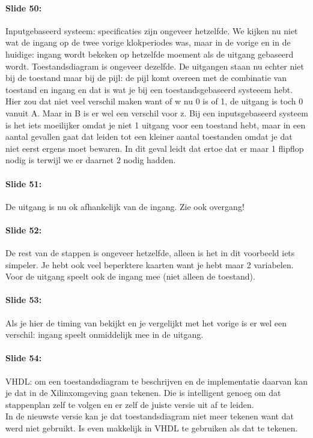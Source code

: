 \documentclass[10pt,a4paper]{book}
\begin{document}
\paragraph{Slide 50:} Inputgebaseerd systeem: specificaties zijn ongeveer hetzelfde. We kijken nu niet wat de ingang op de twee vorige klokperiodes was, maar in de vorige en in de huidige: ingang wordt bekeken op hetzelfde moement als de uitgang gebaseerd wordt. Toestandsdiagram is ongeveer dezelfde. De uitgangen staan nu echter niet bij de toestand maar bij de pijl: de pijl komt overeen met de combinatie van toestand en ingang en dat is wat je bij een toestandsgebaseerd systeeem hebt. Hier zou dat niet veel verschil maken want of w nu 0 is of 1, de uitgang is toch 0 vanuit A. Maar in B is er wel een verschil voor z.
Bij een inputsgebaseerd systeem is het iets moeilijker omdat je niet 1 uitgang voor een toestand hebt, maar in een aantal gevallen gaat dat leiden tot een kleiner aantal toestanden omdat je dat niet eerst ergens moet bewaren.  In dit geval leidt dat ertoe dat er maar 1 flipflop nodig is terwijl we er daarnet 2 nodig hadden.

\paragraph{Slide 51:} De uitgang is nu ok afhankelijk van de ingang. Zie ook overgang! 

\paragraph{Slide 52:} De rest van de stappen is ongeveer hetzelfde, alleen is het in dit voorbeeld iets simpeler. Je hebt ook veel beperktere kaarten want je hebt maar 2 variabelen. Voor de uitgang speelt ook de ingang mee (niet alleen de toestand).

\paragraph{Slide 53:} Als je hier de timing van bekijkt en je vergelijkt met het vorige is er wel een verschil: ingang speelt onmiddelijk mee in de uitgang. 

\paragraph{Slide 54:} VHDL: om een toestandsdiagram te beschrijven en de implementatie daarvan kan je dat in de Xilinxomgeving gaan tekenen. Die is intelligent genoeg om dat stappenplan zelf te volgen en er zelf de juiste versie uit af te leiden.\\
In de nieuwste versie kan je dat toestandsdiagram niet meer tekenen want dat werd niet gebruikt. Is even makkelijk in VHDL te gebruiken als dat te tekenen.
\end{document}
